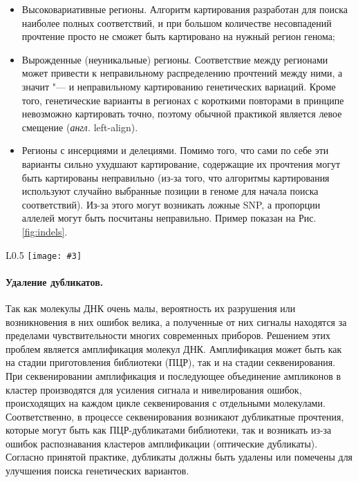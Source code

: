 \documentclass[a4paper,12pt]{article}
\newcommand{\figa}[5]{
\begin{wrapfigure}{#1}{#2\textwidth}
\centering
\texttt{[image: \#3]}
\caption{\label{#4}#5}
\end{wrapfigure}
}
\begin{document}
\begin{itemize}
\item Высоковариативные регионы.
Алгоритм картирования разработан для поиска наиболее полных соответствий, и при большом количестве несовпадений прочтение просто не сможет быть картировано на нужный регион генома;
\item Вырожденные (неуникальные) регионы.
Соответствие между регионами может привести к неправильному распределению прочтений между ними, а значит "--- и неправильному картированию генетических вариаций.
Кроме того, генетические варианты в регионах с короткими повторами в принципе невозможно картировать точно, поэтому обычной практикой является левое смещение (\textit{англ.} left-align).
\item Регионы с инсерциями и делециями.
Помимо того, что сами по себе эти варианты сильно ухудшают картирование, содержащие их прочтения могут быть картированы неправильно (из-за того, что алгоритмы картирования используют случайно выбранные позиции в геноме для начала поиска соответствий).
Из-за этого могут возникать ложные SNP, а пропорции аллелей могут быть посчитаны неправильно.
Пример показан на Рис. \ref{fig:indels}.
\end{itemize}

\figa{L}{0.5}{Indels.pdf}{fig:indels}{Неоптимальное картирование прочтения, содержащего делецию. (1) "--- референсная последовательность, (2) "--- последовательность прочтения, (3) "--- картирование, произведённое алгоритмом, включающее две SNV и одну делецию, (4) "--- оптимальное местоположение делеции}

\paragraph{Удаление дубликатов.}
Так как молекулы ДНК очень малы, вероятность их разрушения или возникновения в них ошибок велика, а полученные от них сигналы находятся за пределами чувствительности многих современных приборов.
Решением этих проблем является амплификация молекул ДНК.
Амплификация может быть как на стадии приготовления библиотеки (ПЦР), так и на стадии секвенирования.
При секвенировании амплификация и последующее объединение ампликонов в кластер производятся для усиления сигнала и нивелирования ошибок, происходящих на каждом цикле секвенирования с отдельными молекулами.
Соответственно, в процессе секвенирования возникают дубликатные прочтения, которые могут быть как ПЦР-дубликатами библиотеки, так и возникать из-за ошибок распознавания кластеров амплификации (оптические дубликаты).
Согласно принятой практике, дубликаты должны быть удалены или помечены для улучшения поиска генетических вариантов\cite{Auwera_2013}.
\end{document}
